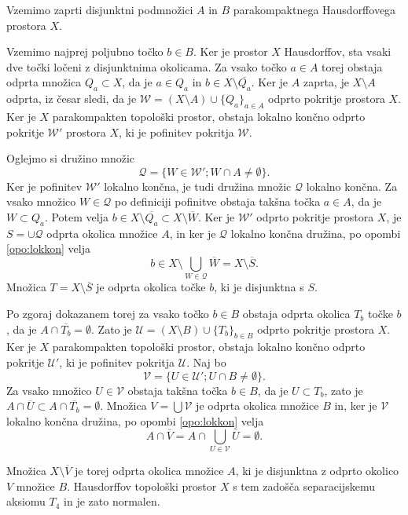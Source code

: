 \documentclass[mat1]{fmfdelo}
\newcommand{\Ucurl}{\mathcal{U}}
\newcommand{\closure}[1]{\overline{#1}}
\begin{document}
\begin{dokaz}
Vzemimo zaprti disjunktni podmnožici $A$ in $B$ parakompaktnega Hausdorff\-o\-ve\-ga prostora $X$.

Vzemimo najprej poljubno točko $b \in B$. Ker je prostor $X$ Hausdorffov, sta vsaki dve točki ločeni z disjunktnima okolicama. Za vsako točko $a \in A$ torej obstaja odprta množica $Q_a \subset X$, da je $a \in Q_a$ in $b \in X \setminus \closure{Q_a}$. Ker je $A$ zaprta, je $X \setminus A$ odprta, iz česar sledi, da je $\mathcal{W} = (X \setminus A)\cup \lbrace Q_a\rbrace_{a \in A}$ odprto pokritje prostora $X$. Ker je $X$ parakompakten topološki prostor, obstaja lokalno končno odprto pokritje $\mathcal{W}'$ prostora $X$, ki je pofinitev pokritja $\mathcal{W}$.

Oglejmo si družino množic \[ \mathcal{Q} = \lbrace W \in \mathcal{W}'; W \cap A \neq \emptyset \rbrace. \]
Ker je pofinitev $\mathcal{W}'$ lokalno končna, je tudi družina množic $\mathcal{Q}$ lokalno končna.
Za vsako množico $W \in \mathcal{Q}$ po definiciji pofinitve obstaja takšna točka $a \in A$, da je $W \subset Q_a$.
 Potem velja $b \in X \setminus \closure{Q_a} \subset X \setminus \closure{W}$. Ker je $\mathcal{W}'$ odprto pokritje prostora $X$, je $S = \cup\mathcal{Q}$ odprta okolica množice $A$, in ker je $\mathcal{Q}$ lokalno končna družina, po opombi \ref{opo:lokkon} velja \[ b \in X \setminus \bigcup_{W \in \mathcal{Q}} \closure{W} = X \setminus \closure{S}. \] Množica $T = X \setminus \closure{S}$ je odprta okolica točke $b$, ki je disjunktna s $S$.

Po zgoraj dokazanem torej za vsako točko $b \in B$ obstaja odprta okolica $T_b$ točke $b$, da je $A \cap \closure{T_b} = \emptyset$. Zato je $\Ucurl = (X\setminus B) \cup \lbrace T_b \rbrace_{b \in B}$ odprto pokritje prostora $X$. Ker je $X$ parakompakten topološki prostor, obstaja lokalno končno odprto pokritje $\Ucurl'$, ki je pofinitev pokritja $\Ucurl$. Naj bo \[ \mathcal{V} = \lbrace U \in \Ucurl' ; U \cap B \neq \emptyset \rbrace. \]
Za vsako množico $U \in \mathcal{V}$ obstaja takšna točka $b \in B$, da je $U \subset T_b$, zato je $A \cap \closure{U} \subset A \cap \closure{T_b} = \emptyset$. Množica $V = \bigcup \mathcal{V}$ je odprta okolica množice $B$ in, ker je $\mathcal{V}$ lokalno končna družina, po opombi \ref{opo:lokkon} velja \[ A \cap \closure{V} = A \cap \bigcup_{U \in \mathcal{V}}\closure{U} = \emptyset.\]

Množica $X \setminus \closure{V}$ je torej odprta okolica množice $A$, ki je disjunktna z odprto okolico $V$ množice $B$. Hausdorffov topološki prostor $X$ s tem zadošča separacijskemu aksiomu $T_4$ in je zato normalen.
\end{dokaz}
\end{document}
